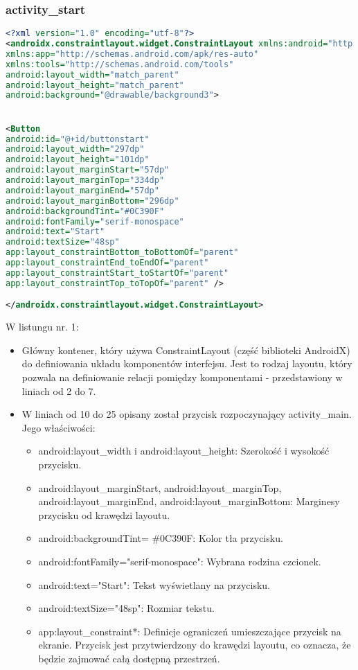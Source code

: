 \subsubsection{activity\_start}
\begin{lstlisting}[caption=Activity\_start, label={lst:kod.xml}, language=XML]
<?xml version="1.0" encoding="utf-8"?>
<androidx.constraintlayout.widget.ConstraintLayout xmlns:android="http://schemas.android.com/apk/res/android"
xmlns:app="http://schemas.android.com/apk/res-auto"
xmlns:tools="http://schemas.android.com/tools"
android:layout_width="match_parent"
android:layout_height="match_parent"
android:background="@drawable/background3">


<Button
android:id="@+id/buttonstart"
android:layout_width="297dp" 
android:layout_height="101dp" 
android:layout_marginStart="57dp"
android:layout_marginTop="334dp"
android:layout_marginEnd="57dp"
android:layout_marginBottom="296dp"
android:backgroundTint="#0C390F"
android:fontFamily="serif-monospace"
android:text="Start"
android:textSize="48sp"
app:layout_constraintBottom_toBottomOf="parent"
app:layout_constraintEnd_toEndOf="parent"
app:layout_constraintStart_toStartOf="parent"
app:layout_constraintTop_toTopOf="parent" />

</androidx.constraintlayout.widget.ConstraintLayout>
\end{lstlisting}
\newpage
\hspace{0.60cm}W listungu nr. 1:
\begin{itemize}
	\item Główny kontener, który używa ConstraintLayout (część biblioteki AndroidX) do definiowania układu komponentów interfejsu. Jest to rodzaj layoutu, który pozwala na definiowanie relacji pomiędzy komponentami - przedstawiony w liniach od 2 do 7.
	\item W liniach od 10 do 25 opisany został przycisk rozpoczynający activity\_main. Jego właściwości:
	\begin{itemize}
		\item android:layout\_width i android:layout\_height: Szerokość i wysokość przycisku.
		\item android:layout\_marginStart, android:layout\_marginTop, android:layout\_marginEnd, android:layout\_marginBottom: Marginesy przycisku od krawędzi layoutu.
		\item android:backgroundTint= \#0C390F: Kolor tła przycisku.
		\item android:fontFamily="serif-monospace": Wybrana rodzina czcionek.
		\item android:text="Start": Tekst wyświetlany na przycisku.
	    \item android:textSize="48sp": Rozmiar tekstu.
		\item app:layout\_constraint*: Definicje ograniczeń umieszczające przycisk na ekranie. Przycisk jest przytwierdzony do krawędzi layoutu, co oznacza, że będzie zajmować całą dostępną przestrzeń.
	\end{itemize}
\end{itemize}
